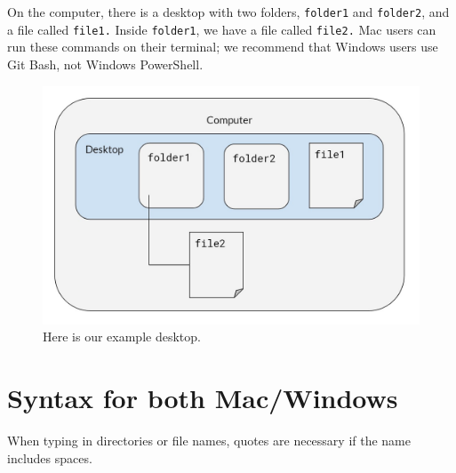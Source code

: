 \documentclass[]{book}
\begin{document}
On the computer, there is a desktop with two folders, \texttt{folder1} and \texttt{folder2}, and a file called \texttt{file1.} Inside \texttt{folder1}, we have a file called \texttt{file2.} Mac users can run these commands on their terminal; we recommend that Windows users use Git Bash, not Windows PowerShell.

\begin{figure}
\centering
\includegraphics{images/ex-desktop.jpg}
\caption{Here is our example desktop.}
\end{figure}

\hypertarget{syntax-for-both-macwindows}{%
\section{Syntax for both Mac/Windows}\label{syntax-for-both-macwindows}}

When typing in directories or file names, quotes are necessary if the name includes spaces.
\end{document}
